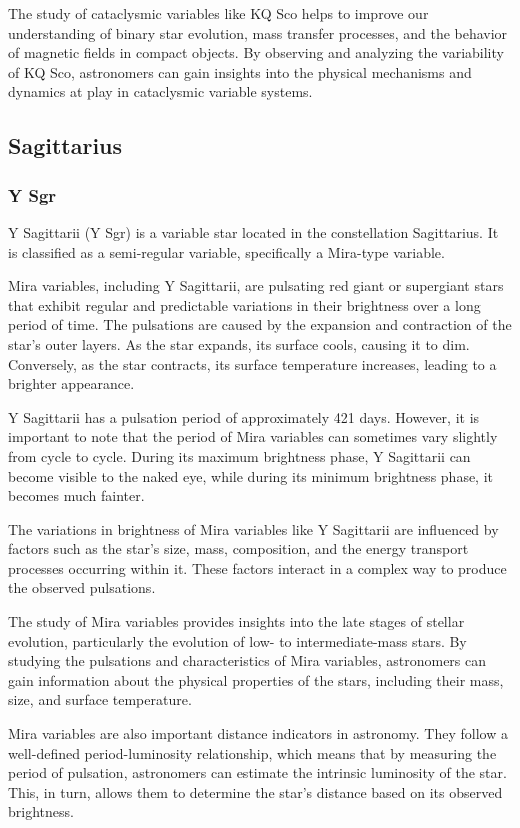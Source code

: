 The study of cataclysmic variables like KQ Sco helps to improve our understanding of binary star evolution, mass transfer processes, and the behavior of magnetic fields in compact objects. By observing and analyzing the variability of KQ Sco, astronomers can gain insights into the physical mechanisms and dynamics at play in cataclysmic variable systems.

\subsection{Sagittarius}
\subsubsection*{ Y Sgr }
Y Sagittarii (Y Sgr) is a variable star located in the constellation Sagittarius. It is classified as a semi-regular variable, specifically a Mira-type variable.

Mira variables, including Y Sagittarii, are pulsating red giant or supergiant stars that exhibit regular and predictable variations in their brightness over a long period of time. The pulsations are caused by the expansion and contraction of the star's outer layers. As the star expands, its surface cools, causing it to dim. Conversely, as the star contracts, its surface temperature increases, leading to a brighter appearance.

Y Sagittarii has a pulsation period of approximately 421 days. However, it is important to note that the period of Mira variables can sometimes vary slightly from cycle to cycle. During its maximum brightness phase, Y Sagittarii can become visible to the naked eye, while during its minimum brightness phase, it becomes much fainter.

The variations in brightness of Mira variables like Y Sagittarii are influenced by factors such as the star's size, mass, composition, and the energy transport processes occurring within it. These factors interact in a complex way to produce the observed pulsations.

The study of Mira variables provides insights into the late stages of stellar evolution, particularly the evolution of low- to intermediate-mass stars. By studying the pulsations and characteristics of Mira variables, astronomers can gain information about the physical properties of the stars, including their mass, size, and surface temperature.

Mira variables are also important distance indicators in astronomy. They follow a well-defined period-luminosity relationship, which means that by measuring the period of pulsation, astronomers can estimate the intrinsic luminosity of the star. This, in turn, allows them to determine the star's distance based on its observed brightness.

